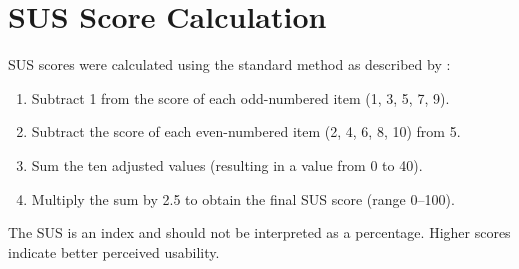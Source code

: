 \section{SUS Score Calculation}
\label{app:sus_calculation}

SUS scores were calculated using the standard method as described by \textcite{MeasuringSUS2011}:
\begin{enumerate}
  \item Subtract 1 from the score of each odd-numbered item (1, 3, 5, 7, 9).
  \item Subtract the score of each even-numbered item (2, 4, 6, 8, 10) from 5.
  \item Sum the ten adjusted values (resulting in a value from 0 to 40).
  \item Multiply the sum by 2.5 to obtain the final SUS score (range 0–100).
\end{enumerate}

The SUS is an index and should not be interpreted as a percentage. Higher scores indicate better perceived usability.
